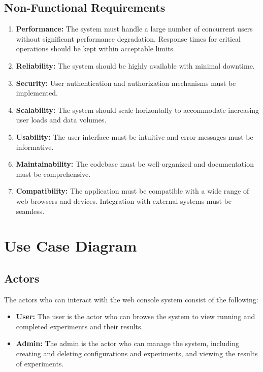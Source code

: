 \newpage
\subsection{Non-Functional Requirements}

\begin{enumerate}
    \item \textbf{Performance:} The system must handle a large number of concurrent users without significant performance degradation. Response times for critical operations should be kept within acceptable limits.
    \item \textbf{Reliability:} The system should be highly available with minimal downtime. 
    \item \textbf{Security:} User authentication and authorization mechanisms must be implemented.
    \item \textbf{Scalability:} The system should scale horizontally to accommodate increasing user loads and data volumes.
    \item \textbf{Usability:} The user interface must be intuitive and error messages must be informative.
    \item \textbf{Maintainability:} The codebase must be well-organized and documentation must be comprehensive.
    \item \textbf{Compatibility:} The application must be compatible with a wide range of web browsers and devices. Integration with external systems must be seamless.
\end{enumerate}

\section{Use Case Diagram}
\subsection{Actors}

The actors who can interact with the web console system consist of the following:
\begin{itemize}
    \item \textbf{User:} The user is the actor who can browse the system to view running and completed experiments and their results.
    \item \textbf{Admin:} The admin is the actor who can manage the system, including creating and deleting configurations and experiments, and viewing the results of experiments.
\end{itemize}


